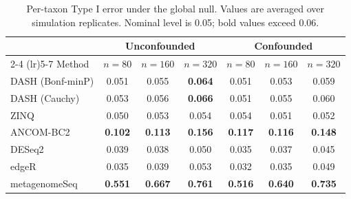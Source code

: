 \begin{table}[t]
\centering
\caption{Per-taxon Type I error under the global null. Values are averaged over simulation replicates. Nominal level is 0.05; bold values exceed 0.06.}
\label{tab:typeI_firstgrid}
\begin{tabular}{lcccccc}
\toprule
 & \multicolumn{3}{c}{Unconfounded} & \multicolumn{3}{c}{Confounded} \\
\cmidrule(lr){2-4} \cmidrule(lr){5-7}
Method & $n=80$ & $n=160$ & $n=320$ & $n=80$ & $n=160$ & $n=320$ \\
\midrule
DASH (Bonf-minP) & 0.051 & 0.055 & \textbf{0.064} & 0.051 & 0.053 & 0.059 \\
DASH (Cauchy) & 0.053 & 0.056 & \textbf{0.066} & 0.051 & 0.055 & 0.060 \\
ZINQ & 0.050 & 0.053 & 0.054 & 0.054 & 0.051 & 0.052 \\
ANCOM-BC2 & \textbf{0.102} & \textbf{0.113} & \textbf{0.156} & \textbf{0.117} & \textbf{0.116} & \textbf{0.148} \\
DESeq2 & 0.039 & 0.038 & 0.050 & 0.035 & 0.037 & 0.045 \\
edgeR & 0.035 & 0.039 & 0.053 & 0.032 & 0.035 & 0.049 \\
metagenomeSeq & \textbf{0.551} & \textbf{0.667} & \textbf{0.761} & \textbf{0.516} & \textbf{0.640} & \textbf{0.735} \\
\bottomrule
\end{tabular}
\end{table}
